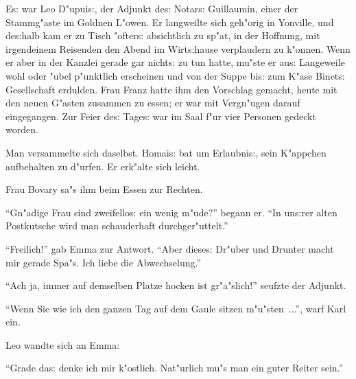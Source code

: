 \documentclass[oneside,12pt]{book}
\newcommand{\s}{s:}%
\begin{document}
E{\s} war Leo D"upui{\s}, der Adjunkt de{\s} Notar{\s} Guillaumin,
einer der Stamm\-g"aste im Goldnen L"owen. Er langweilte sich
geh"orig in Yonville, und de{\s}halb kam er zu Tisch "ofter{\s}
absichtlich zu sp"at, in der Hoffnung, mit irgendeinem Reisenden
den Abend im Wirt{\s}hause verplaudern zu k"onnen. Wenn er aber in
der Kanzlei gerade gar nicht{\s} zu tun hatte, mu"ste er au{\s}
Langeweile wohl oder "ubel p"unktlich erscheinen und von der Suppe
bi{\s} zum K"ase Binet{\s} Gesellschaft erdulden. Frau Franz hatte
ihm den Vorschlag gemacht, heute mit den neuen G"asten zusammen zu
essen; er war mit Vergn"ugen darauf eingegangen. Zur Feier de{\s}
Tage{\s} war im Saal f"ur vier Personen gedeckt worden.

Man versammelte sich daselbst. Homai{\s} bat um Erlaubni{\s}, sein
K"appchen aufbehalten zu d"urfen. Er erk"alte sich leicht.

Frau Bovary sa"s ihm beim Essen zur Rechten.

"`Gn"adige Frau sind zweifello{\s} ein wenig m"ude?"' begann er.
"`In un{\s}rer alten Postkutsche wird man schauderhaft
durchger"uttelt."'

"`Freilich!"' gab Emma zur Antwort. "`Aber diese{\s} Dr"uber und
Drunter macht mir gerade Spa"s. Ich liebe die Abwechselung."'

"`Ach ja, immer auf demselben Platze hocken ist gr"a"slich!"'
seufzte der Adjunkt.

"`Wenn Sie wie ich den ganzen Tag auf dem Gaule sitzen
m"u"sten~..."', warf Karl ein.

Leo wandte sich an Emma:

"`Grade da{\s} denke ich mir k"ostlich. Nat"urlich mu"s man ein
guter Reiter sein."'
\end{document}
